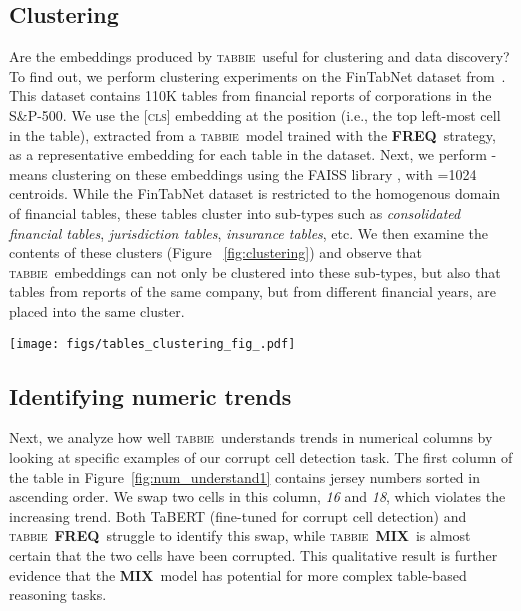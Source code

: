 \documentclass[11pt]{article}
\newcommand{\name}[0]{\textsc{tabbie}}
\newcommand{\freq}[0]{\textbf{FREQ}}
\newcommand{\mix}[0]{\textbf{MIX}}
\begin{document}
\subsection{Clustering}
Are the embeddings produced by \name\ useful for clustering and data discovery? To find out, we perform clustering experiments on the FinTabNet dataset from~\citet{Zheng_2021_WACV}. This dataset contains 	110K tables from financial reports of corporations in the S\&P-500. We use the \textsc{[cls]} embedding at the  position (i.e., the top left-most cell in the table), extracted from a \name\ model trained with the  \freq\ strategy, as a representative embedding for each table in the dataset. Next, we perform -means clustering on these embeddings using the FAISS library \cite{faissJDH17}, with =1024 centroids. While the FinTabNet dataset is restricted to the homogenous domain of financial tables, these tables cluster into sub-types such as \emph{consolidated financial tables}, \emph{jurisdiction tables}, \emph{insurance tables}, etc. We then examine the contents of these clusters (Figure ~\ref{fig:clustering}) and observe that \name\ embeddings can not only be clustered into these sub-types, but also that tables from reports of the same company, but from different financial years, are placed into the same cluster. 
\makeatother
\begin{figure*}[t]
 \centering
  \texttt{[image: figs/tables\_clustering\_fig\_.pdf]}
  \caption{Sample tables from clusters obtained by running -means on \name's \textsc{[cls]} embeddings on the FinTabNet dataset.  \name\ not only clusters embeddings  into reasonable semantic types, such as \emph{Table of Contents} (first row), but it also places tables of the same type from the same company into the same cluster (second and third rows). We provide the source images of the corresponding tables in this figure. }
  \label{fig:clustering}
\end{figure*} 
\subsection{Identifying numeric trends}
Next, we analyze how well \name\ understands trends in numerical columns by looking at specific examples of our corrupt cell detection task. The first column of the table in Figure~\ref{fig:num_understand1} contains jersey numbers sorted in ascending order. We swap two cells in this column, \emph{16} and \emph{18}, which violates the increasing trend. Both TaBERT (fine-tuned for corrupt cell detection) and \name\ \freq\ struggle to identify this swap, while \name\ \mix\ is almost certain that the two cells have been corrupted. This qualitative result is further evidence that the \mix\ model has potential for more complex table-based reasoning tasks. 
\end{document}
